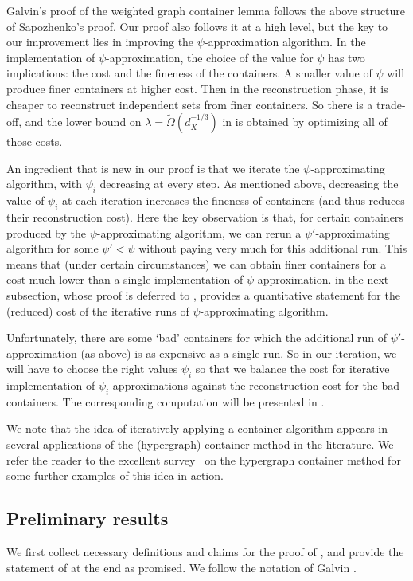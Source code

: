 \documentclass[10pt,a4paper]{amsart}
\theoremstyle{definition}
\newcommand{\0}[0]{\emptyset}
\begin{document}
Galvin's proof \cite{galvin_threshold} of the weighted graph container lemma follows the above structure of Sapozhenko's proof. Our proof also follows it at a high level, but the key to our improvement lies in improving the $\psi$-approximation algorithm. In the implementation of $\psi$-approximation, the choice of the value for $\psi$ has two implications: the cost and the fineness of the containers. A smaller value of $\psi$ will produce finer containers at higher cost. Then in the reconstruction phase, it is cheaper to reconstruct independent sets from finer containers. So there is a trade-off, and the lower bound on $\lambda=\tilde \Omega(d_X^{-1/3})$ in \cite{galvin_threshold} is obtained by optimizing all of those costs.

An ingredient that is new in our proof is that we iterate the $\psi$-approximating algorithm, with $\psi_i$ decreasing at every step. As mentioned above, decreasing the value of $\psi_i$ at each iteration increases the fineness of containers (and thus reduces their reconstruction cost). Here the key observation is that, for certain containers produced by the $\psi$-approximating algorithm, we can rerun a $\psi'$-approximating algorithm for some $\psi'<\psi$ without paying very much for this additional run. This means that (under certain circumstances) we can obtain finer containers for a cost much lower than a single implementation of $\psi$-approximation.  in the next subsection, whose proof is deferred to , provides a quantitative statement for the (reduced) cost of the iterative runs of $\psi$-approximating algorithm. 

Unfortunately, there are some `bad' containers for which the additional run of $\psi'$-approximation (as above) is as expensive as a single run. So in our iteration, we will have to choose the right values $\psi_i$ so that we balance the cost for iterative implementation of $\psi_i$-approximations against the reconstruction cost for the bad containers. The corresponding computation will be presented in  .

We note that the idea of iteratively applying a container algorithm appears in several applications of the (hypergraph) container method in the literature. We refer the reader to the excellent survey~\cite{balogh2018method} on the hypergraph container method for some further examples of this idea in action. 

\subsection{Preliminary results}
We first collect necessary definitions and claims for the proof of , and provide the statement of  at the end as promised. We follow the notation of Galvin \cite{Galvin_independent}.
\end{document}
